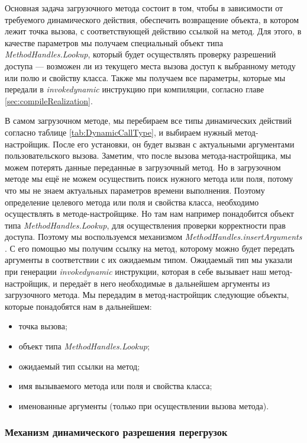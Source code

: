 Основная задача загрузочного метода состоит в том, чтобы в зависимости от требуемого динамического действия, обеспечить возвращение объекта, в котором лежит точка вызова, с соответствующей действию ссылкой на метод. Для этого, в качестве параметров мы получаем специальный объект типа \textit{MethodHandles.Lookup}, который будет осуществлять проверку разрешений доступа --- возможен ли из текущего места вызова доступ к выбранному методу или полю и свойству класса. Также мы получаем все параметры, которые мы передали в \textit{invokedynamic} инструкцию при компиляции, согласно главе \ref{sec:compileRealization}.

В самом загрузочном методе, мы перебираем все типы динамических  действий согласно таблице \ref{tab:DynamicCallType}, и выбираем нужный метод-настройщик. После его установки, он будет вызван с актуальными аргументами пользовательского вызова. Заметим, что после вызова метода-настройщика, мы можем потерять данные переданные в загрузочный метод. Но в загрузочном методе мы ещё не можем осуществить поиск нужного метода или поля, потому что мы не знаем актуальных параметров времени выполнения. Поэтому определение целевого метода или поля и свойства класса, необходимо осуществлять в методе-настройщике. Но там нам например понадобится объект типа \textit{MethodHandles.Lookup}, для осуществления проверки корректности прав доступа. Поэтому мы воспользуемся механизмом  \textit{MethodHandles.insertArguments} \cite{javadoc:MethodHandlesLookup}. С его помощью мы получим ссылку на метод, которому можно будет передать аргументы в соответствии с их ожидаемым типом. Ожидаемый тип мы указали при генерации \textit{invokedynamic} инструкции, которая в себе вызывает наш метод-настройщик, и передаёт в него необходимые в дальнейшем аргументы из загрузочного метода. Мы передадим в метод-настройщик следующие объекты, которые понадобятся нам в дальнейшем:
\begin{itemize}
    \item точка вызова;
    \item объект типа \textit{MethodHandles.Lookup};
    \item ожидаемый тип ссылки на метод;
    \item имя вызываемого метода или поля и свойства класса;
    \item именованные аргументы (только при осуществлении вызова метода).
\end{itemize}


\subsubsection{Механизм динамического разрешения перегрузок}
\label{realization:dynamicResolve}

